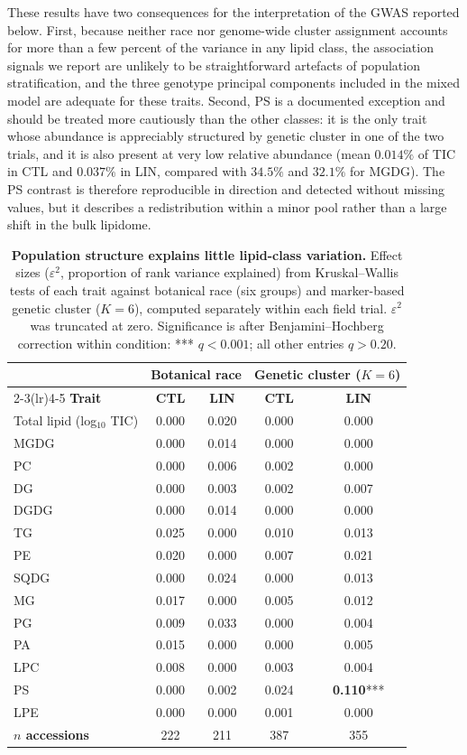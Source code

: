 These results have two consequences for the interpretation of the GWAS reported below. First, because neither race nor genome-wide cluster assignment accounts for more than a few percent of the variance in any lipid class, the association signals we report are unlikely to be straightforward artefacts of population stratification, and the three genotype principal components included in the mixed model are adequate for these traits. Second, PS is a documented exception and should be treated more cautiously than the other classes: it is the only trait whose abundance is appreciably structured by genetic cluster in one of the two trials, and it is also present at very low relative abundance (mean $0.014\%$ of TIC in CTL and $0.037\%$ in LIN, compared with $34.5\%$ and $32.1\%$ for MGDG). The PS contrast is therefore reproducible in direction and detected without missing values, but it describes a redistribution within a minor pool rather than a large shift in the bulk lipidome.

\begin{table}[!ht]
\centering
\caption{\textbf{Population structure explains little lipid-class variation.} Effect sizes ($\varepsilon^2$, proportion of rank variance explained) from Kruskal--Wallis tests of each trait against botanical race (six groups) and marker-based genetic cluster ($K=6$), computed separately within each field trial. $\varepsilon^2$ was truncated at zero. Significance is after Benjamini--Hochberg correction within condition: *** $q<0.001$; all other entries $q>0.20$.}
\label{tab:race_structure}
\small
\begin{tabular}{lcccc}
\toprule
& \multicolumn{2}{c}{\textbf{Botanical race}} & \multicolumn{2}{c}{\textbf{Genetic cluster ($K=6$)}} \\
\cmidrule(lr){2-3}\cmidrule(lr){4-5}
\textbf{Trait} & \textbf{CTL} & \textbf{LIN} & \textbf{CTL} & \textbf{LIN} \\
\midrule
Total lipid (log$_{10}$ TIC) & 0.000 & 0.020 & 0.000 & 0.000 \\
MGDG & 0.000 & 0.014 & 0.000 & 0.000 \\
PC   & 0.000 & 0.006 & 0.002 & 0.000 \\
DG   & 0.000 & 0.003 & 0.002 & 0.007 \\
DGDG & 0.000 & 0.014 & 0.000 & 0.000 \\
TG   & 0.025 & 0.000 & 0.010 & 0.013 \\
PE   & 0.020 & 0.000 & 0.007 & 0.021 \\
SQDG & 0.000 & 0.024 & 0.000 & 0.013 \\
MG   & 0.017 & 0.000 & 0.005 & 0.012 \\
PG   & 0.009 & 0.033 & 0.000 & 0.004 \\
PA   & 0.015 & 0.000 & 0.000 & 0.005 \\
LPC  & 0.008 & 0.000 & 0.003 & 0.004 \\
PS   & 0.000 & 0.002 & 0.024 & \textbf{0.110}*** \\
LPE  & 0.000 & 0.000 & 0.001 & 0.000 \\
\midrule
\textbf{$n$ accessions} & 222 & 211 & 387 & 355 \\
\bottomrule
\end{tabular}
\end{table}

